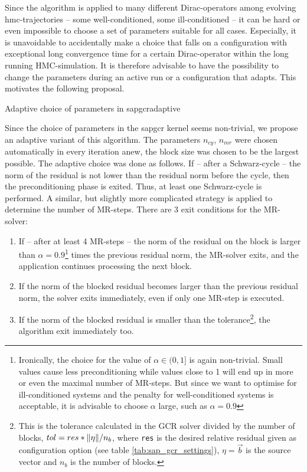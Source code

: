 \documentclass{article}
\theoremstyle{plain} %
\theoremstyle{convention} %
\theoremstyle{remark} %
\def\code#1{\texttt{#1}}
\numberwithin{equation}{section}
\begin{document}
Since the algorithm is applied to many different Dirac-operators among evolving \acrshort{hmc}-trajectories -- some well-conditioned, some ill-conditioned -- it can be hard or even impossible to choose a set of parameters suitable for all cases. Especially, it is unavoidable to accidentally make a choice that falls on a configuration with exceptional long convergence time for a certain Dirac-operator within the long running HMC-simulation. It is therefore advisable to have the possibility to change the parameters during an active run or a configuration that adapts. This motivates the following proposal.

\begin{proposal}{Adaptive choice of parameters in \acrshort{sapgcr}}{adaptive}

Since the choice of parameters in the \acrshort{sapgcr} kernel seems non-trivial, we propose an adaptive variant of this algorithm. The parameters $n_{cy}$, $n_{mr}$ were chosen automatically in every iteration anew, the block size was chosen to be the largest possible. The adaptive choice was done as follows. If -- after a Schwarz-cycle -- the norm of the residual is not lower than the residual norm before the cycle, then the preconditioning phase is exited. Thus, at least one Schwarz-cycle is performed. A similar, but slightly more complicated strategy is applied to determine the number of MR-steps. There are \num{3} exit conditions for the MR-solver:

\begin{enumerate}[label={\arabic*)}]
  \item If -- after at least \num{4} MR-steps -- the norm of the residual on the block is larger than $\alpha = 0.9$\footnote{Ironically, the choice for the value of $\alpha \in (0, 1]$ is again non-trivial. Small values cause less preconditioning while values close to \num{1} will end up in more or even the maximal number of MR-steps. But since we want to optimise for ill-conditioned systems and the penalty for well-conditioned systems is acceptable, it is advisable to choose $\alpha$ large, such as $\alpha = 0.9$} times the previous residual norm, the MR-solver exits, and the application continues processing the next block.
  \item If the norm of the blocked residual becomes larger than the previous residual norm, the solver exits immediately, even if only one MR-step is executed.
  \item If the norm of the blocked residual is smaller than the tolerance\footnote{This is the tolerance calculated in the GCR solver divided by the number of blocks, $tol = res*\norm{\eta}/n_b$, where \code{res} is the desired relative residual given as configuration option (see table \ref{tab:sap_gcr_settings}), $\eta = \vec{b}$ is the source vector and $n_b$ is the number of blocks.}, the algorithm exit immediately too.
\end{enumerate}


\end{proposal}
\end{document}
